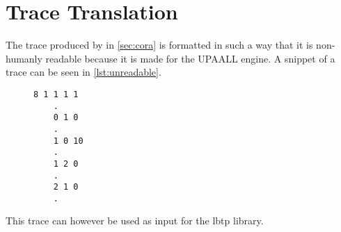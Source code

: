\section{Trace Translation} \label{sec:trace_trans}
The trace produced by in \cref{sec:cora} is formatted in such a way that it is non-humanly readable because it is made for the UPAALL engine. A snippet of a trace can be seen in \cref{lst:unreadable}.
\begin{figure}[H]
\begin{lstlisting}[caption={Non-humanly readable trace}, label=lst:unreadable]
	8 1 1 1 1 
	.
	0 1 0
	.
	1 0 10
	.
	1 2 0
	.
	2 1 0
	.
\end{lstlisting}
\end{figure}
This trace can however be used as input for the \gls{lbtp}\cite{libutap} library.
